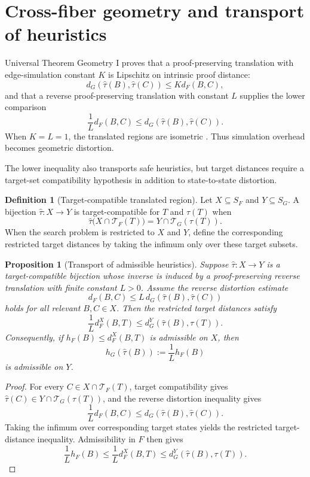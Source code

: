 \documentclass[11pt]{article}
\newtheorem{proposition}[theorem]{Proposition}
\theoremstyle{definition}
\newtheorem{definition}[theorem]{Definition}
\theoremstyle{remark}
\begin{document}
\section{Cross-fiber geometry and transport of heuristics}

Universal Theorem Geometry I proves that a proof-preserving translation with edge-simulation constant $K$ is Lipschitz on intrinsic proof distance:
\[
d_G(\widehat\tau(B),\widehat\tau(C))\le Kd_F(B,C),
\]
and that a reverse proof-preserving translation with constant $L$ supplies the lower comparison
\[
\frac1L d_F(B,C)
\le d_G(\widehat\tau(B),\widehat\tau(C)).
\]
When $K=L=1$, the translated regions are isometric \cite{UTGI}. Thus simulation overhead becomes geometric distortion.

The lower inequality also transports safe heuristics, but target distances require a target-set compatibility hypothesis in addition to state-to-state distortion.

\begin{definition}[Target-compatible translated region]
Let $X\subseteq S_F$ and $Y\subseteq S_G$. A bijection $\widehat\tau:X\to Y$ is target-compatible for $T$ and $\tau(T)$ when
\[
\widehat\tau\bigl(X\cap\mathcal T_F(T)\bigr)=Y\cap\mathcal T_G(\tau(T)).
\]
When the search problem is restricted to $X$ and $Y$, define the corresponding restricted target distances by taking the infimum only over these target subsets.
\end{definition}

\begin{proposition}[Transport of admissible heuristics]\label{prop:transport}
Suppose $\widehat\tau:X\to Y$ is a target-compatible bijection whose inverse is induced by a proof-preserving reverse translation with finite constant $L>0$. Assume the reverse distortion estimate
\[
d_F(B,C)\le L\,d_G(\widehat\tau(B),\widehat\tau(C))
\]
holds for all relevant $B,C\in X$. Then the restricted target distances satisfy
\[
\frac1L d_F^X(B,T)\le d_G^Y(\widehat\tau(B),\tau(T)).
\]
Consequently, if $h_F(B)\le d_F^X(B,T)$ is admissible on $X$, then
\[
h_G(\widehat\tau(B)):=\frac{1}{L}h_F(B)
\]
is admissible on $Y$.
\end{proposition}

\begin{proof}
For every $C\in X\cap\mathcal T_F(T)$, target compatibility gives $\widehat\tau(C)\in Y\cap\mathcal T_G(\tau(T))$, and the reverse distortion inequality gives
\[
\frac1L d_F(B,C)\le d_G(\widehat\tau(B),\widehat\tau(C)).
\]
Taking the infimum over corresponding target states yields the restricted target-distance inequality. Admissibility in $F$ then gives
\[
\frac1L h_F(B)\le \frac1L d_F^X(B,T)\le d_G^Y(\widehat\tau(B),\tau(T)).
\]
\end{proof}
\end{document}

